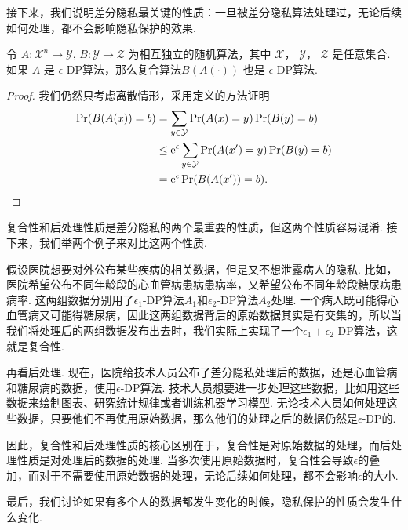 接下来，我们说明差分隐私最关键的性质：一旦被差分隐私算法处理过，无论后续如何处理，都不会影响隐私保护的效果.

\begin{proposition}[后处理]\label{prop:post-processing}
    令 $A : \mathcal X^n \to \mathcal Y$, $B : \mathcal Y \to \mathcal Z$ 为相互独立的随机算法，其中 $\mathcal X$， $\mathcal Y$， $\mathcal Z$ 是任意集合. 如果 $A$ 是 $\epsilon$-DP算法，那么复合算法$ B(A(\cdot))$ 也是 $\epsilon$-DP算法.
\end{proposition}
\begin{proof}
我们仍然只考虑离散情形，采用定义的方法证明
    \[
    \begin{aligned}
        \Pr(B(A(x)) = b) &= \sum_{y \in \mathcal Y} \Pr(A(x) = y) \Pr(B(y) = b) \\
        &\leq \mathrm{e}^{\epsilon} \sum_{y\in \mathcal Y}\Pr(A(x') = y)\Pr(B(y) = b)\\
        &= \mathrm{e}^{\epsilon}\Pr(B(A(x')) = b).
    \end{aligned}
    \]
\end{proof}

复合性和后处理性质是差分隐私的两个最重要的性质，但这两个性质容易混淆. 接下来，我们举两个例子来对比这两个性质. 

假设医院想要对外公布某些疾病的相关数据，但是又不想泄露病人的隐私. 比如，医院希望公布不同年龄段的心血管病患病患病率，又希望公布不同年龄段糖尿病患病率. 这两组数据分别用了$\epsilon_1$-DP算法$A_1$和$\epsilon_2$-DP算法$A_2$处理. 一个病人既可能得心血管病又可能得糖尿病，因此这两组数据背后的原始数据其实是有交集的，所以当我们将处理后的两组数据发布出去时，我们实际上实现了一个$\epsilon_1+\epsilon_2$-DP算法，这就是复合性.

再看后处理. 现在，医院给技术人员公布了差分隐私处理后的数据，还是心血管病和糖尿病的数据，使用$\epsilon$-DP算法. 技术人员想要进一步处理这些数据，比如用这些数据来绘制图表、研究统计规律或者训练机器学习模型. 无论技术人员如何处理这些数据，只要他们不再使用原始数据，那么他们的处理之后的数据仍然是$\epsilon$-DP的.

因此，复合性和后处理性质的核心区别在于，复合性是对原始数据的处理，而后处理性质是对处理后的数据的处理. 当多次使用原始数据时，复合性会导致$\epsilon$的叠加，而对于不需要使用原始数据的处理，无论后续如何处理，都不会影响$\epsilon$的大小.

最后，我们讨论如果有多个人的数据都发生变化的时候，隐私保护的性质会发生什么变化. 

